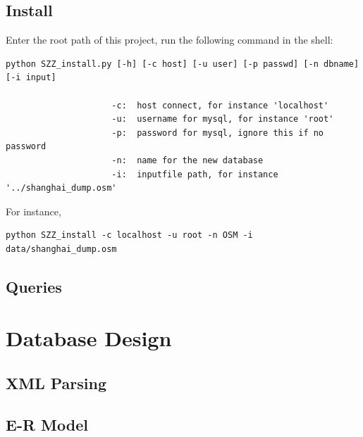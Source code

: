 \documentclass[final,1p,times]{elsarticle}
\begin{document}
\subsection{Install}
Enter the root path of this project, run the following command in the shell:
\begin{verbatim}
python SZZ_install.py [-h] [-c host] [-u user] [-p passwd] [-n dbname] [-i input]

                     -c:  host connect, for instance 'localhost'
                     -u:  username for mysql, for instance 'root'
                     -p:  password for mysql, ignore this if no password
                     -n:  name for the new database
                     -i:  inputfile path, for instance '../shanghai_dump.osm'
\end{verbatim}
For instance,

\begin{verbatim}
python SZZ_install -c localhost -u root -n OSM -i data/shanghai_dump.osm
\end{verbatim}

\subsection{Queries}

\section{Database Design}

\subsection{XML Parsing}

\subsection{E-R Model}
\end{document}
